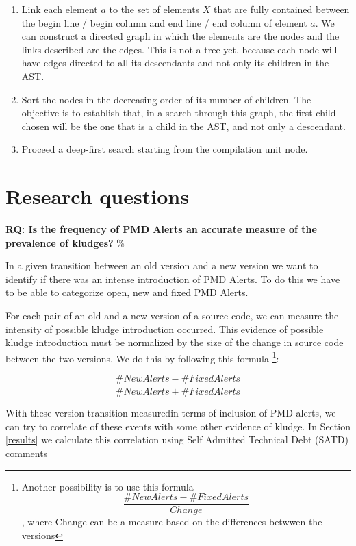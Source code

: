 \documentclass[
]{article}
\begin{document}
\begin{enumerate}
\item
  Link each element \(a\) to the set of elements \(X\) that are fully
  contained between the begin line / begin column and end line / end
  column of element \(a\). We can construct a directed graph in which
  the elements are the nodes and the links described are the edges. This
  is not a tree yet, because each node will have edges directed to all
  its descendants and not only its children in the AST.

\item
  Sort the nodes in the decreasing order of its number of children. The
  objective is to establish that, in a search through this graph, the
  first child chosen will be the one that is a child in the AST, and not
  only a descendant.

\item
  Proceed a deep-first search starting from the compilation unit node.
\end{enumerate}

\section{Research questions}
\label{as_whole}

\noindent
\textbf{RQ: Is the frequency of PMD Alerts an accurate measure of the prevalence of kludges?}
\%\label{PMD_Kludge}

In a given transition between an old version and a new version we want
to identify if there was an intense introduction of PMD Alerts. To do
this we have to be able to categorize open, new and fixed PMD Alerts.

For each pair of an old and a new version of a source code, we can
measure the intensity of possible kludge introduction occurred. This
evidence of possible kludge introduction must be normalized by the size
of the change in source code between the two versions. We do this by
following this formula
\footnote{Another possibility is to use this formula \[ \frac{\#NewAlerts - \#FixedAlerts}{Change}    \], where Change can be a measure based on the differences betwwen the versions}:

\[ \frac{\#NewAlerts - \#FixedAlerts}{\#NewAlerts + \#FixedAlerts}    \]

With these version transition measuredin terms of inclusion of PMD
alerts, we can try to correlate of these events with some other evidence
of kludge. In Section \ref{results} we calculate this correlation using
Self Admitted Technical Debt (SATD) comments
\end{document}
